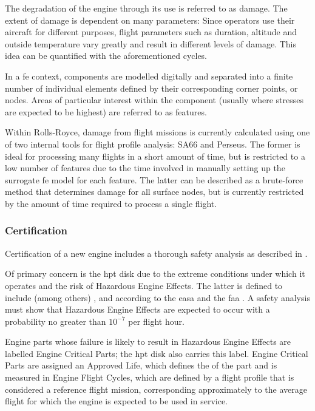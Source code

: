 The degradation of the engine through its use is referred to as damage. The extent of damage is dependent on many parameters: Since operators use their aircraft for different purposes, flight parameters such as duration, altitude and outside temperature vary greatly and result in different levels of damage. This idea can be quantified with the aforementioned cycles.

In a \ac{fe} context, components are modelled digitally and separated into a finite number of individual elements defined by their corresponding corner points, or nodes. Areas of particular interest within the component (usually where stresses are expected to be highest) are referred to as features.

Within Rolls-Royce, damage from flight missions is currently calculated using one of two internal tools for flight profile analysis: SA66 and Perseus. %
The former is ideal for processing many flights in a short amount of time, but is restricted to a low number of features due to the time involved in manually setting up the surrogate \ac{fe} model for each feature. The latter can be described as a brute-force method that determines damage for all surface nodes, but is currently restricted by the amount of time required to process a single flight.

\subsubsection{Certification}
Certification of a new engine includes a thorough safety analysis as described in \cite{easa_certification_2015}.

Of primary concern is the \ac{hpt} disk due to the extreme conditions under which it operates and the risk of Hazardous Engine Effects. The latter is defined to include (among others) ,  and  according to the \ac{easa} and the \ac{faa} \cite{easa_certification_2015, faa_guidance_2007}. A safety analysis must show that Hazardous Engine Effects are expected to occur with a probability no greater than \(10^{-7}\) per flight hour.

Engine parts whose failure is likely to result in Hazardous Engine Effects are labelled Engine Critical Parts; the \ac{hpt} disk also carries this label. Engine Critical Parts are assigned an Approved Life, which defines the  \cite{easa_certification_2015} of the part and is measured in Engine Flight Cycles, which are defined by a flight profile that is considered a reference flight mission, corresponding approximately to the average flight for which the engine is expected to be used in service.

